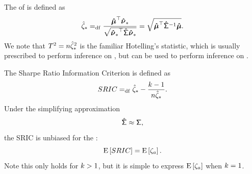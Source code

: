 \documentclass[10pt,a4paper,english]{article}
\theoremstyle{plain}
\theoremstyle{definition}
\theoremstyle{remark}
\begin{document}
The \txtSR of \sportwopt is defined as
\begin{equation}
  \ssropt \defeq \frac{\tr{\svmu}\sportwopt}{\sqrt{\qform{\svsig}{\sportwopt}}}
  = \sqrt{\qiform{\svsig}{\svmu}}.
\end{equation}
We note that $T^2=\ssiz\ssrsqopt$ is the familiar Hotelling's statistic,
which is usually prescribed to perform inference on \pvmu, but
can be used to perform inference on \psnrsqopt.
\cite{anderson2003introduction,pav_the_book}

The Sharpe Ratio Information Criterion is defined as 
\cite{doi:10.1080/14697688.2020.1718746}
\begin{equation}
  SRIC \defeq \ssropt - \frac{\nstrat-1}{\ssiz\ssropt}.
\end{equation}
Under the simplifying approximation
\begin{equation}
\label{apx:perfect_cov}
\svsig \approx \pvsig,
\end{equation}
the SRIC is unbiased for the \txtASNR:
\begin{equation}
\E{SRIC} = \E{\psnr[a]}.
\label{eqn:sric_raison_detre}
\end{equation}
Note this only holds for $\nstrat > 1$, but it is simple to express
$\E{\psnr[a]}$ when $\nstrat=1$.
\end{document}
